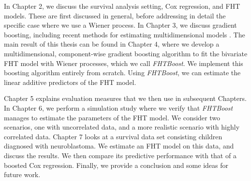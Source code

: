 In Chapter 2, we discuss the survival analysis setting, Cox regression, and FHT models.
These are first discussed in general, before addressing in detail the specific case where we use a Wiener process.
In Chapter 3, we discuss gradient boosting, including recent methods for estimating multidimensional models \citep{thomas2018}.
The main result of this thesis can be found in Chapter 4, where we develop a multidimensional, component-wise gradient boosting algorithm to fit the bivariate FHT model with Wiener processes, which we call \textit{FHTBoost}.
We implement this boosting algorithm entirely from scratch.
Using \textit{FHTBoost}, we can estimate the linear additive predictors of the FHT model.

Chapter 5 explains evaluation measures that we then use in subsequent Chapters.
In Chapter 6, we perform a simulation study where we verify that \textit{FHTBoost} manages to estimate the parameters of the FHT model.
We consider two scenarios, one with uncorrelated data, and a more realistic scenario with highly correlated data.
Chapter 7 looks at a survival data set consisting children diagnosed with neuroblastoma.
We estimate an FHT model on this data, and discuss the results.
We then compare its predictive performance with that of a boosted Cox regression.
Finally, we provide a conclusion and some ideas for future work.